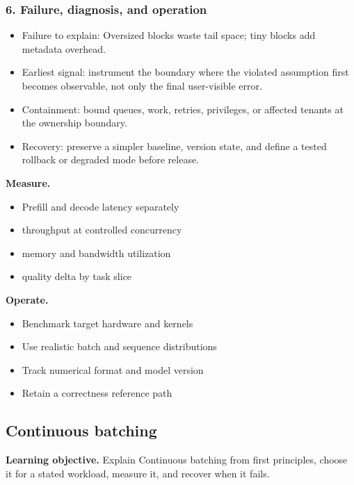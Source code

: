 \subsubsection*{6. Failure, diagnosis, and operation}
\begin{itemize}
\item Failure to explain: Oversized blocks waste tail space; tiny blocks add metadata overhead.
\item Earliest signal: instrument the boundary where the violated assumption first becomes observable, not only the final user-visible error.
\item Containment: bound queues, work, retries, privileges, or affected tenants at the ownership boundary.
\item Recovery: preserve a simpler baseline, version state, and define a tested rollback or degraded mode before release.
\end{itemize}
\textbf{Measure.}\begin{itemize}
\item Prefill and decode latency separately
\item throughput at controlled concurrency
\item memory and bandwidth utilization
\item quality delta by task slice
\end{itemize}
\textbf{Operate.}\begin{itemize}
\item Benchmark target hardware and kernels
\item Use realistic batch and sequence distributions
\item Track numerical format and model version
\item Retain a correctness reference path
\end{itemize}
\subsection{Continuous batching}
\textbf{Learning objective.} Explain Continuous batching from first principles, choose it for a stated workload, measure it, and recover when it fails.
